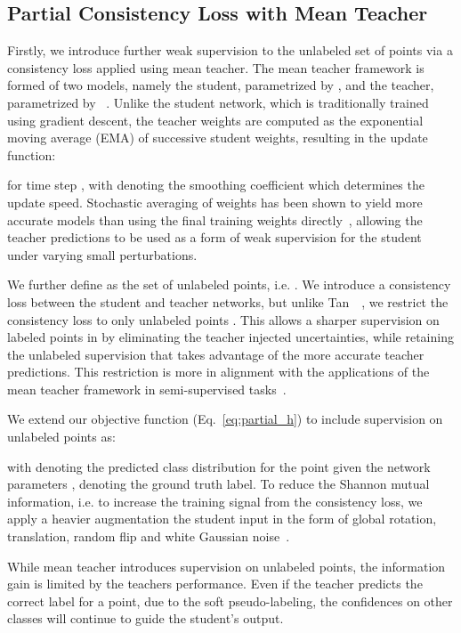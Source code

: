 \documentclass[10pt,twocolumn,letterpaper]{article}
\begin{document}
\subsection{Partial Consistency Loss with Mean Teacher} \label{sec:mt}

Firstly, we introduce further weak supervision to the unlabeled set of points via a consistency loss applied using mean teacher. The mean teacher framework is formed of two models, namely the student, parametrized by , and the teacher, parametrized by ~\cite{nips2017meanteacher}. Unlike the student network, which is traditionally trained using gradient descent, the teacher weights are computed as the exponential moving average (EMA) of successive student weights, resulting in the update function:

for time step , with  denoting the smoothing coefficient which determines the update speed. Stochastic averaging of weights has been shown to yield more accurate models than using the final training weights directly~\cite{siam1992averaging, nips2017meanteacher}, allowing the teacher predictions to be used as a form of weak supervision for the student under varying small perturbations.

We further define  as the set of unlabeled points, i.e. . We introduce a consistency loss between the student and teacher networks, but unlike Tan~\etal~\cite{isbd2019wssmt}, we restrict the consistency loss to only unlabeled points . This allows a sharper supervision on labeled points in  by eliminating the teacher injected uncertainties, while retaining the unlabeled supervision that takes advantage of the more accurate teacher predictions. This restriction is more in alignment with the applications of the mean teacher framework in semi-supervised tasks~\cite{nips2017meanteacher, arvix2020structured, cvpr2021temporalaction}.

We extend our objective function (Eq.~\ref{eq:partial_h}) to include supervision on unlabeled points as:

with  denoting the predicted class distribution for the point  given the network parameters ,  denoting the ground truth label. To reduce the Shannon mutual information, i.e. to increase the training signal from the consistency loss, we apply a heavier augmentation the student input in the form of global rotation, translation, random flip and white Gaussian noise~\cite{arxiv2020fixmatch, arxiv2019mixmatch, cvpr2021pixmatch}.


While mean teacher introduces supervision on unlabeled points, the information gain is limited by the teachers performance. Even if the teacher predicts the correct label for a point, due to the soft pseudo-labeling, the confidences on other classes will continue to guide the student's output.
\end{document}
